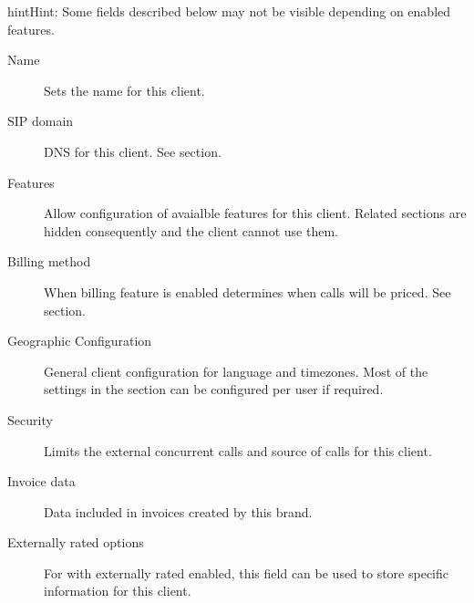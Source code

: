 \documentclass[letterpaper,10pt,english]{sphinxmanual}
\begin{document}
\begin{notice}{hint}{Hint:}
Some fields described below may not be visible depending on enabled features.
\end{notice}
\begin{description}
\item[{Name}] \leavevmode{}\label{brand/virtual_pbx:term-name}
Sets the name for this client.

\item[{SIP domain}] \leavevmode{}\label{brand/virtual_pbx:term-sip-domain}
DNS for this client. See {\hyperref[getting_started/internal_calls/brand_portal:company\string-sip\string-domain]{}} section.

\item[{Features}] \leavevmode{}\label{brand/virtual_pbx:term-features}
Allow configuration of avaialble features for this client.
Related sections are hidden consequently and the client cannot use them.

\item[{Billing method}] \leavevmode{}\label{brand/virtual_pbx:term-billing-method}
When billing feature is enabled determines when calls will be priced. See {\hyperref[brand/billing/index:billing]{}} section.

\item[{Geographic Configuration}] \leavevmode{}\label{brand/virtual_pbx:term-geographic-configuration}
General client configuration for language and timezones. Most of the settings in the section can be
configured per user if required.

\item[{Security}] \leavevmode{}\label{brand/virtual_pbx:term-security}
Limits the external concurrent calls and source of calls for this client.

\item[{Invoice data}] \leavevmode{}\label{brand/virtual_pbx:term-invoice-data}
Data included in invoices created by this brand.

\item[{Externally rated options}] \leavevmode{}\label{brand/virtual_pbx:term-externally-rated-options}
For {\hyperref[brand/peering/peering_contracts:peering\string-contracts]{}} with externally rated enabled, this field can be used to store specific
information for this client.


\end{description}
\end{document}
